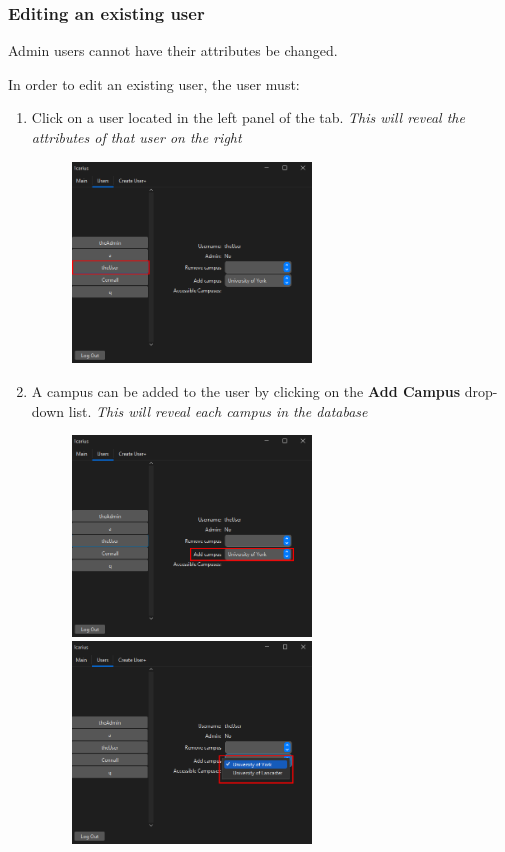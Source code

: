 \subsubsection{Editing an existing user}
Admin users cannot have their attributes be changed.

In order to edit an existing user, the user must:
\begin{enumerate}
    \item Click on a user located in the left panel of the tab.  \textit{This will reveal the attributes of that user on the right}
    \begin{figure}[H]
        \centering
        \includegraphics[width=0.6\textwidth]{UsersTab/editUser/editUser.png}
    \end{figure}

    \item A campus can be added to the user by clicking on the \textbf{Add Campus} drop-down list. \textit{This will reveal each campus in the database}
    \begin{figure}[H]
        \centering
        \includegraphics[width=0.6\textwidth]{UsersTab/editUser/editUserAdd.png}
        \includegraphics[width=0.6\textwidth]{UsersTab/editUser/editUserAddView.png}
    \end{figure}
    

\end{enumerate}
